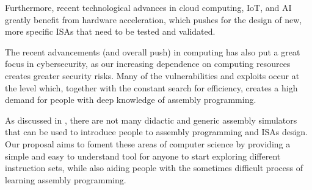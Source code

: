 Furthermore, recent technological advances in \gls{cloud computing}, \gls{IoT}, and \gls{AI} greatly benefit from hardware acceleration, which pushes for the design of new, more specific \glspl{ISA} that need to be tested and validated.

The recent advancements (and overall push) in computing has also put a great focus in cybersecurity, as our increasing dependence on computing resources creates greater security risks. Many of the vulnerabilities and exploits occur at the  level which, together with the constant search for efficiency, creates a high demand for people with deep knowledge of \gls{assembly} programming.

As discussed in , there are not many didactic and generic \gls{assembly} simulators that can be used to introduce people to \gls{assembly} programming and \glspl{ISA} design. Our proposal aims to foment these areas of computer science by providing a simple and easy to understand tool for anyone to start exploring different instruction sets, while also aiding people with the sometimes difficult process of learning \gls{assembly} programming.
